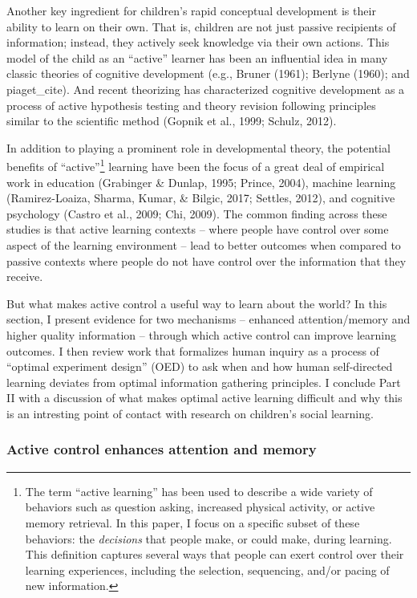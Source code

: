 \documentclass[a4paper,man,apacite,floatsintext]{apa6}
\begin{document}
Another key ingredient for children's rapid conceptual development is
their ability to learn on their own. That is, children are not just
passive recipients of information; instead, they actively seek knowledge
via their own actions. This model of the child as an ``active'' learner
has been an influential idea in many classic theories of cognitive
development (e.g., Bruner (1961); Berlyne (1960); and piaget\_cite). And
recent theorizing has characterized cognitive development as a process
of active hypothesis testing and theory revision following principles
similar to the scientific method (Gopnik et al., 1999; Schulz, 2012).

In addition to playing a prominent role in developmental theory, the
potential benefits of ``active''\footnote{The term ``active learning''
  has been used to describe a wide variety of behaviors such as question
  asking, increased physical activity, or active memory retrieval. In
  this paper, I focus on a specific subset of these behaviors: the
  \emph{decisions} that people make, or could make, during learning.
  This definition captures several ways that people can exert control
  over their learning experiences, including the selection, sequencing,
  and/or pacing of new information.} learning have been the focus of a
great deal of empirical work in education (Grabinger \& Dunlap, 1995;
Prince, 2004), machine learning (Ramirez-Loaiza, Sharma, Kumar, \&
Bilgic, 2017; Settles, 2012), and cognitive psychology (Castro et al.,
2009; Chi, 2009). The common finding across these studies is that active
learning contexts -- where people have control over some aspect of the
learning environment -- lead to better outcomes when compared to passive
contexts where people do not have control over the information that they
receive.

But what makes active control a useful way to learn about the world? In
this section, I present evidence for two mechanisms -- enhanced
attention/memory and higher quality information -- through which active
control can improve learning outcomes. I then review work that
formalizes human inquiry as a process of ``optimal experiment design''
(OED) to ask when and how human self-directed learning deviates from
optimal information gathering principles. I conclude Part II with a
discussion of what makes optimal active learning difficult and why this
is an intresting point of contact with research on children's social
learning.

\subsubsection{Active control enhances attention and
memory}\label{active-control-enhances-attention-and-memory}
\end{document}
